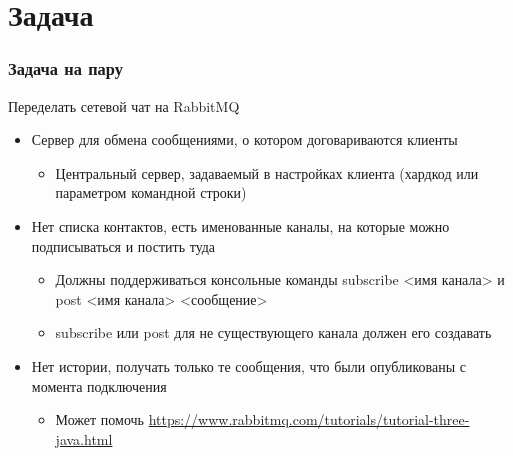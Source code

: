\documentclass[xetex,mathserif,serif]{beamer}
\begin{document}
	\section{Задача}

	\begin{frame}
		\frametitle{Задача на пару}
		Переделать сетевой чат на RabbitMQ
		\begin{itemize}
			\item Сервер для обмена сообщениями, о котором договариваются клиенты
			\begin{itemize}
				\item Центральный сервер, задаваемый в настройках клиента (хардкод или параметром командной строки)
			\end{itemize}
			\item Нет списка контактов, есть именованные каналы, на которые можно подписываться и постить туда
			\begin{itemize}
				\item Должны поддерживаться консольные команды subscribe <имя канала> и post <имя канала> <сообщение>
				\item subscribe или post для не существующего канала должен его создавать
			\end{itemize}
			\item Нет истории, получать только те сообщения, что были опубликованы с момента подключения
			\begin{itemize}
				\item Может помочь \url{https://www.rabbitmq.com/tutorials/tutorial-three-java.html}
			\end{itemize}
		\end{itemize}
	\end{frame}
\end{document}
